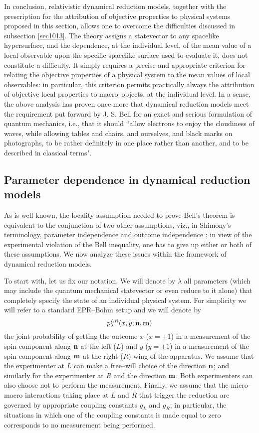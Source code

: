 \documentclass[10pt,a4paper]{article}
\begin{document}
In conclusion, relativistic dynamical reduction models, together
with the prescription for the attribution of objective properties
to physical systems proposed in this section, allows one to
overcome the difficulties discussed in subsection \ref{sec1013}.
The theory assigns a statevector to any spacelike hypersurface,
and the dependence, at the individual level, of the mean value of
a local observable upon the specific spacelike surface used to
evaluate it, does not constitute a difficulty. It simply requires
a precise and appropriate criterion for relating the objective
properties of a physical system to the mean values of local
observables: in particular, this criterion permits practically
always the attribution of objective local properties to
macro--objects, at the individual level. In a sense, the above
analysis has proven once more that dynamical reduction models meet
the requirement put forward by J. S. Bell \cite{bellns} for an
exact and serious formulation of quantum mechanics, i.e., that it
should ``allow electrons to enjoy the cloudiness of waves, while
allowing tables and chairs, and ourselves, and black marks on
photographs, to be rather definitely in one place rather than
another, and to be described in classical terms".

\subsection{Parameter dependence in dynamical reduction models}
\label{sec011}

As is well known, the locality assumption needed to prove Bell's
theorem \cite{bell71} is equivalent to the conjunction of two
other assumptions, viz., in Shimony's terminology, parameter
independence and outcome independence \cite{sz,vf82,ja84,shi1}; in
view of the experimental violation of the Bell inequality, one has
to give up either or both of these assumptions. We now analyze
these issues within the framework of dynamical reduction models.

To start with, let us fix our notation. We will denote by
$\lambda$ all parameters (which may include the quantum mechanical
statevector or even reduce to it alone) that completely specify
the state of an individual physical system. For simplicity we will
refer to a standard EPR--Bohm setup and we will denote by
\begin{equation}
p^{LR}_{\lambda}(x,y;{\bf n}, {\bf m})
\end{equation}
the joint probability of getting the outcome $x$ ($x = \pm 1$) in
a measurement of the spin component along ${\bf n}$ at the left
($L$) and $y$ ($y = \pm 1$) in a measurement of the spin component
along ${\bf m}$ at the right ($R$) wing of the apparatus. We
assume that the experimenter at $L$ can make a free--will choice
of the direction ${\bf n}$; and similarly for the experimenter at
$R$ and the direction ${\bf m}$. Both experimenters can also
choose not to perform the measurement. Finally, we assume that the
micro--macro interactions taking place at $L$ and $R$ that trigger
the reduction are governed by appropriate coupling constants
$g_{L}$ and $g_{R}$; in particular, the situations in which one of
the coupling constants is made equal to zero corresponds to no
measurement being performed.
\end{document}

